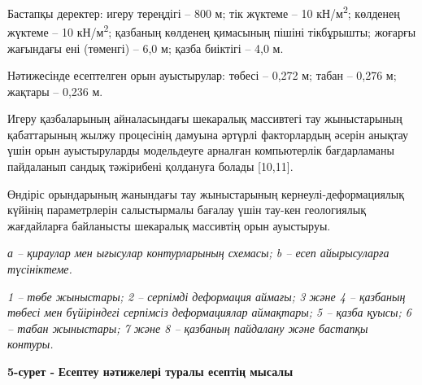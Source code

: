 Бастапқы деректер: игеру тереңдігі -- 800 м; тік жүктеме -- 10
кН/м\textsuperscript{2}; көлденең жүктеме -- 10 кН/м\textsuperscript{2};
қазбаның көлденең қимасының пішіні тікбұрышты; жоғарғы жағындағы ені
(төменгі) -- 6,0 м; қазба биіктігі -- 4,0 м.

Нәтижесінде есептелген орын ауыстырулар: төбесі -- 0,272 м; табан --
0,276 м; жақтары -- 0,236 м.

Игеру қазбаларының айналасындағы шекаралық массивтегі тау жыныстарының
қабаттарының жылжу процесінің дамуына әртүрлі факторлардың әсерін
анықтау үшін орын ауыстыруларды модельдеуге арналған компьютерлік
бағдарламаны пайдаланып сандық тәжірибені қолдануға болады {[}10,11{]}.

Өндіріс орындарының жанындағы тау жыныстарының кернеулі-деформациялық
күйінің параметрлерін салыстырмалы бағалау үшін тау-кен геологиялық
жағдайларға байланысты шекаралық массивтің орын ауыстыруы.


\emph{а -- қираулар мен ығысулар контурларының схемасы; b -- есеп
айырысуларға түсініктеме.}

\emph{1 -- төбе жыныстары; 2 -- серпімді деформация аймағы; 3 және 4 --
қазбаның төбесі мен бүйіріндегі серпімсіз деформациялар аймақтары; 5 --
қазба қуысы; 6 -- табан жыныстары; 7 және 8 -- қазбаның пайдалану және
бастапқы контуры.}

{\bfseries 5-сурет -} {\bfseries Есептеу нәтижелері туралы есептің мысалы}

